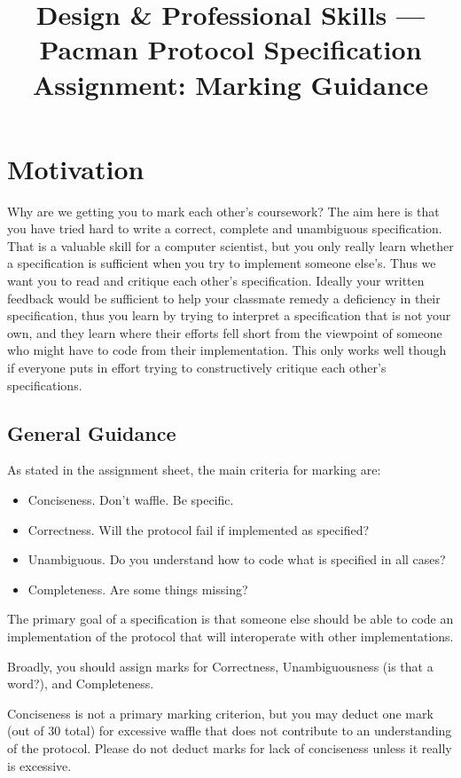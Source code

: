 \documentclass{article}
\title{Design \& Professional Skills --- Pacman Protocol Specification Assignment: Marking Guidance}
\author{}
\date{}
\begin{document}
\maketitle

\section*{Motivation}

Why are we getting you to mark each other's coursework?  The aim here
is that you have tried hard to write a correct, complete and
unambiguous specification.  That is a valuable skill for a computer
scientist, but you only really learn whether a specification is
sufficient when you try to implement someone else's.  Thus we want you
to read and critique each other's specification.  Ideally your written
feedback would be sufficient to help your classmate remedy a
deficiency in their specification, thus you learn by trying to
interpret a specification that is not your own, and they learn where
their efforts fell short from the viewpoint of someone who might have
to code from their implementation.  This only works well though if
everyone puts in effort trying to constructively critique each other's
specifications.

\subsection*{General Guidance}

As stated in the assignment sheet, the main criteria for marking are:
\begin{itemize}
  \item Conciseness.  Don't waffle.  Be specific.
  \item Correctness.  Will the protocol fail if implemented as specified?
  \item Unambiguous.  Do you understand how to code what is specified in all cases?
  \item Completeness. Are some things missing?
\end{itemize}

The primary goal of a specification is that someone else should be able to
code an implementation of the protocol that will interoperate with
other implementations.

Broadly, you should assign marks for Correctness, Unambiguousness (is
that a word?), and Completeness.

Conciseness is not a primary marking criterion, but you may deduct one
mark (out of 30 total) for excessive waffle that does not contribute
to an understanding of the protocol.  Please do not deduct marks for
lack of conciseness unless it really is excessive.
\end{document}
